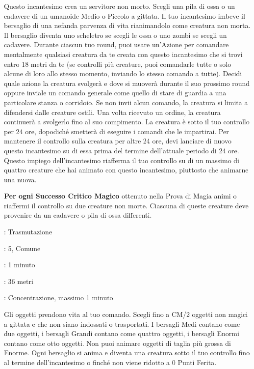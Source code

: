 \begin{multicols}{2}
Questo incantesimo crea un servitore non morto. Scegli una pila di ossa o un cadavere di un umanoide Medio o Piccolo a gittata. Il tuo incantesimo imbeve il bersaglio di una nefanda parvenza di vita rianimandolo come creatura non morta. Il bersaglio diventa uno scheletro se scegli le ossa o uno zombi se scegli un cadavere. Durante ciascun tuo round, puoi usare un'Azione per comandare mentalmente qualsiasi creatura da te creata con questo incantesimo che si trovi entro 18 metri da te (se controlli più creature, puoi comandarle tutte o solo alcune di loro allo stesso momento, inviando lo stesso comando a tutte). Decidi quale azione la creatura svolgerà e dove si muoverà durante il suo prossimo round oppure inviale un comando generale come quello di stare di guardia a una particolare stanza o corridoio. Se non invii alcun comando, la creatura si limita a difendersi dalle creature ostili. Una volta ricevuto un ordine, la creatura continuerà a svolgerlo fino al suo compimento. La creatura è sotto il tuo controllo per 24 ore, dopodiché smetterà di eseguire i comandi che le impartirai. Per mantenere il controllo sulla creatura per altre 24 ore, devi lanciare di nuovo questo incantesimo su di essa prima del termine dell'attuale periodo di 24 ore. Questo impiego dell'incantesimo riafferma il tuo controllo su di un massimo di quattro creature che hai animato con questo incantesimo, piuttosto che animarne una nuova.

\textbf{Per ogni Successo Critico Magico} ottenuto nella Prova di Magia animi o riaffermi il controllo su due creature non morte. Ciascuna di queste creature deve provenire da un cadavere o pila di ossa differenti.

\label{Animate Object}
\noindent\colorbox{OBSSgold!10}{
\begin{minipage}{0.95\linewidth}
\begin{description}[noitemsep, topsep=0pt, parsep=0pt, partopsep=0pt, leftmargin=0cm, labelwidth=1.3cm]
\item[\textbf{Lista}]: Trasmutazione
\item[\textbf{Livello}]: 5, Comune
\item[\textbf{Lancio}]: 1 minuto
\item[\textbf{Gittata}]: 36 metri
\item[\textbf{Durata}]: Concentrazione, massimo 1 minuto
\end{description}
\end{minipage}}\smallskip

Gli oggetti prendono vita al tuo comando. Scegli fino a CM/2 oggetti non magici a gittata e che non siano indossati o trasportati. I bersagli Medi contano come due oggetti, i bersagli Grandi contano come quattro oggetti, i bersagli Enormi contano come otto oggetti. Non puoi animare oggetti di taglia più grossa di Enorme. Ogni bersaglio si anima e diventa una creatura sotto il tuo controllo fino al termine dell'incantesimo o finché non viene ridotto a 0 Punti Ferita.


\end{multicols}
